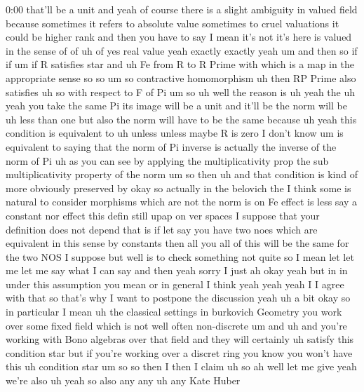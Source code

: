 \begin{unfinished}{0:00}
that'll  be  a  unit  and  yeah  of  course
there  is  a  slight  ambiguity  in  valued
field  because  sometimes  it  refers  to
absolute  value  sometimes  to  cruel
valuations  it  could  be  higher  rank  and
then  you  have  to  say  I  mean  it's  not
it's  here  is  valued  in  the  sense  of  of
uh  of  yes  real  value  yeah  exactly
exactly  yeah
um  and  then  so  if  if  um  if
R
satisfies  star  and  uh  Fe  from  R  to  R
Prime  with  which  is  a  map  in  the
appropriate  sense
so
so
um  so  contractive
homomorphism  uh  then  RP  Prime  also
satisfies  uh  so  with  respect  to  F  of
Pi  um
so  uh  well  the  reason  is
uh  yeah  the
uh  yeah  you  take  the  same  Pi  its  image
will  be  a  unit  and  it'll  be  the  norm
will
be  uh  less  than  one  but  also  the  norm
will  have  to  be  the  same  because  uh  yeah
this  condition  is  equivalent  to  uh
unless  unless  maybe  R  is  zero  I  don't
know  um  is  equivalent  to  saying  that  the
norm  of  Pi  inverse  is  actually  the
inverse  of  the  norm  of  Pi
uh  as  you  can  see  by  applying  the
multiplicativity  prop  the  sub
multiplicativity  property  of  the
norm  um  so  then  uh  and  that  condition  is
kind  of  more  obviously  preserved  by  okay
so  actually  in  the  belovich  the  I  think
some  is  natural  to  consider  morphisms
which  are  not  the  norm  is  on  Fe  effect
is  less  say  a  constant  nor  effect  this
defin  still  upap  on  ver  spaces  I  suppose
that  your  definition  does  not  depend
that  is  if  let  say  you  have  two  noes
which  are  equivalent  in  this  sense  by
constants  then  all  you  all  of  this  will
be  the  same  for  the  two  NOS  I  suppose
but  well  is  to  check  something  not  quite
so  I  mean  let  let  me  let  me  say  what  I
can  say  and  then  yeah  sorry  I  just  ah
okay  yeah  but  in  in  under  this
assumption  you  mean  or  in
general
I
think  yeah  yeah  yeah  I  I  agree  with  that
so  that's  why  I  want  to  postpone  the
discussion  yeah  uh  a
bit  okay  so  in  particular  I  mean  uh  the
classical  settings  in  burkovich  Geometry
you  work  over  some  fixed  field  which  is
not  well  often  non-discrete  um  and  uh
and  you're  working  with  Bono  algebras
over  that  field  and  they  will  certainly
uh  satisfy  this  condition  star
but  if  you're  working  over  a  discret
ring  you  know  you  won't  have  this  uh
condition
star  um  so  so  then  I  then  I  claim  uh
so  ah  well  let  me  give  yeah  we're  also
uh  yeah  so  also  any  any  uh  any  Kate
Huber

\end{unfinished}
